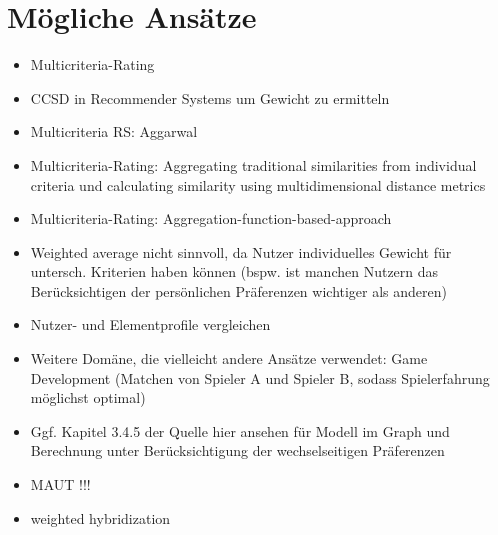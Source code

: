 \section{Mögliche Ansätze}
\begin{itemize}
    \item Multicriteria-Rating %
    \item CCSD in Recommender Systems um Gewicht zu ermitteln %
    \item Multicriteria RS: Aggarwal %
    \item Multicriteria-Rating: Aggregating traditional similarities from individual criteria und calculating similarity using multidimensional distance metrics %
    \item Multicriteria-Rating: Aggregation-function-based-approach %
    \item Weighted average nicht sinnvoll, da Nutzer individuelles Gewicht für untersch. Kriterien haben können (bspw. ist manchen Nutzern das Berücksichtigen der persönlichen Präferenzen wichtiger als anderen) %
    \item Nutzer- und Elementprofile vergleichen %
    \item Weitere Domäne, die vielleicht andere Ansätze verwendet: Game Development (Matchen von Spieler A und Spieler B, sodass Spielerfahrung möglichst optimal) %
    \item Ggf. Kapitel 3.4.5 der Quelle hier ansehen für Modell im Graph und Berechnung unter Berücksichtigung der wechselseitigen Präferenzen %
    \item MAUT !!! %
    \item weighted hybridization %
\end{itemize}

